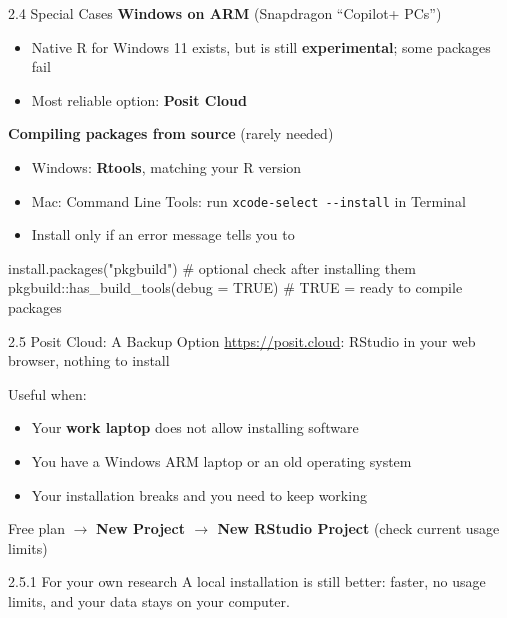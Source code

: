 \documentclass[
  ignorenonframetext,
  aspectratio=169,
]{beamer}
\newenvironment{Shaded}{\begin{snugshade}}{\end{snugshade}}
\newcommand{\AttributeTok}[1]{\textcolor[rgb]{0.40,0.45,0.13}{#1}}
\newcommand{\CommentTok}[1]{\textcolor[rgb]{0.37,0.37,0.37}{#1}}
\newcommand{\ConstantTok}[1]{\textcolor[rgb]{0.56,0.35,0.01}{#1}}
\newcommand{\FunctionTok}[1]{\textcolor[rgb]{0.28,0.35,0.67}{#1}}
\newcommand{\NormalTok}[1]{\textcolor[rgb]{0.00,0.23,0.31}{#1}}
\newcommand{\SpecialCharTok}[1]{\textcolor[rgb]{0.37,0.37,0.37}{#1}}
\newcommand{\StringTok}[1]{\textcolor[rgb]{0.13,0.47,0.30}{#1}}
\providecommand{\tightlist}{%
  \setlength{\itemsep}{0pt}\setlength{\parskip}{0pt}}
\begin{document}
\begin{frame}[fragile]{2.4 Special Cases}
\protect{}\label{special-cases}
\textbf{Windows on ARM} (Snapdragon ``Copilot+ PCs'')

\begin{itemize}
\tightlist
\item
  Native R for Windows 11 exists, but is still \textbf{experimental};
  some packages fail
\item
  Most reliable option: \textbf{Posit Cloud}
\end{itemize}

\textbf{Compiling packages from source} (rarely needed)

\begin{itemize}
\tightlist
\item
  Windows: \textbf{Rtools}, matching your R version
\item
  Mac: Command Line Tools: run \texttt{xcode-select\ -\/-install} in
  Terminal
\item
  Install only if an error message tells you to
\end{itemize}

\begin{Shaded}
\begin{Highlighting}[]
\FunctionTok{install.packages}\NormalTok{(}\StringTok{"pkgbuild"}\NormalTok{)              }\CommentTok{\# optional check after installing them}
\NormalTok{pkgbuild}\SpecialCharTok{::}\FunctionTok{has\_build\_tools}\NormalTok{(}\AttributeTok{debug =} \ConstantTok{TRUE}\NormalTok{)   }\CommentTok{\# TRUE = ready to compile packages}
\end{Highlighting}
\end{Shaded}
\end{frame}

\begin{frame}{2.5 Posit Cloud: A Backup Option}
\protect{}\label{sec-cloud}
\url{https://posit.cloud}: RStudio in your web browser, nothing to
install

Useful when:

\begin{itemize}
\tightlist
\item
  Your \textbf{work laptop} does not allow installing software
\item
  You have a Windows ARM laptop or an old operating system
\item
  Your installation breaks and you need to keep working
\end{itemize}

Free plan \(\rightarrow\) \textbf{New Project \(\rightarrow\) New
RStudio Project} (check current usage limits)

\begin{exampleblock}{2.5.1 For your own research}
\protect{}\label{for-your-own-research}
A local installation is still better: faster, no usage limits, and your
data stays on your computer.
\end{exampleblock}
\end{frame}
\end{document}
